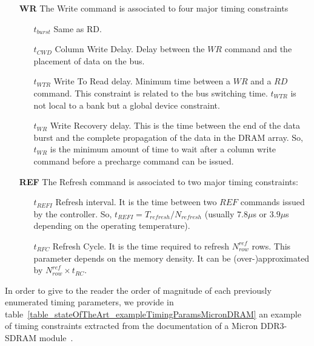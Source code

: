\documentclass[main.tex]{subfiles}
\begin{document}
\begin{itemize}
    \item[\textbf{WR}] The Write command is associated to four major timing constraints
        \begin{itemize}
            \item[$t_{burst}$] Same as RD.
            \item[$t_{CWD}$] Column Write Delay. Delay between the $WR$ command and the placement of data on the bus.
            \item[$t_{WTR}$] Write To Read delay. Minimum time between a $WR$ and a $RD$ command. This constraint is related to the bus switching time. $t_{WTR}$ is not local to a bank but a global device constraint.
            \item[$t_{WR}$] Write Recovery delay. This is the time between the end of the data burst and the complete propagation of the data in the DRAM array. So, $t_{WR}$ is the minimum amount of time to wait after a column write command before a precharge command can be issued.
        \end{itemize}
    
    \item[\textbf{REF}] The Refresh command is associated to two major timing constraints:
        \begin{itemize}
            \item[$t_{REFI}$] Refresh interval. It is the time between two $REF$ commands issued by the controller. So, $t_{REFI} = T_{refresh} / N_{refresh}$ (usually $7.8\mu$s  or $3.9\mu$s depending on the operating temperature). 
            \item[$t_{RFC}$] Refresh Cycle. It is the time required to refresh $N_{row}^{ref}$ rows. This parameter depends on the memory density. It can be (over-)approximated by $N_{row}^{ref} \times t_{RC}$.\\
        \end{itemize}
\end{itemize}

In order to give to the reader the order of magnitude of each previously enumerated timing parameters, we provide in table~\ref{table_stateOfTheArt_exampleTimingParamsMicronDRAM} an example of timing constraints extracted from the documentation of a Micron DDR3-SDRAM module~\cite{Doc_micron}.
\end{document}
